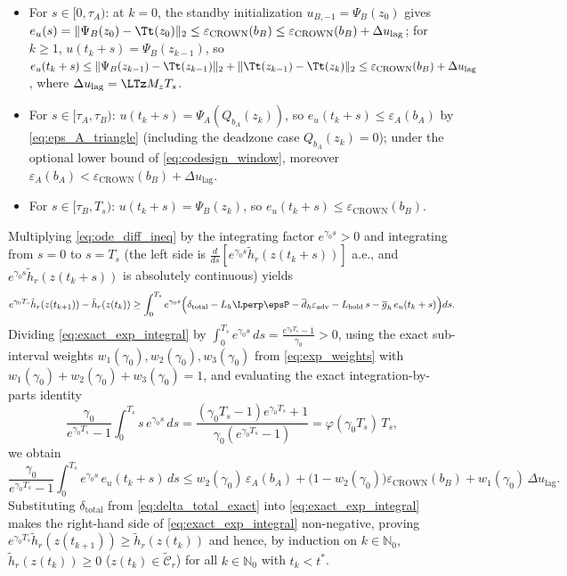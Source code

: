 \begin{itemize}
    \item For \(s \in [0, \tau_A)\): at \(k = 0\), the standby initialization \(u_{B,-1} = \Psi_B(z_0)\) gives \(e_u(s) = \|\Psi_B(z_0) - \Tt(z_0)\|_2 \le \varepsilon_{\mathrm{CROWN}}(b_B) \le \varepsilon_{\mathrm{CROWN}}(b_B) + \Delta u_{\mathrm{lag}}\); for \(k \ge 1\), \(u(t_k + s) = \Psi_B(z_{k-1})\), so \(e_u(t_k + s) \le \|\Psi_B(z_{k-1}) - \Tt(z_{k-1})\|_2 + \|\Tt(z_{k-1}) - \Tt(z_k)\|_2 \le \varepsilon_{\mathrm{CROWN}}(b_B) + \Delta u_{\mathrm{lag}}\), where \(\Delta u_{\mathrm{lag}} = \LTz M_z T_s\).
    \item For \(s \in [\tau_A, \tau_B)\): \(u(t_k + s) = \Psi_A(Q_{b_A}(z_k))\), so \(e_u(t_k + s) \le \varepsilon_A(b_A)\) by \eqref{eq:eps_A_triangle} (including the deadzone case \(Q_{b_A}(z_k) = 0\)); under the optional lower bound of \eqref{eq:codesign_window}, moreover \(\varepsilon_A(b_A) < \varepsilon_{\mathrm{CROWN}}(b_B) + \Delta u_{\mathrm{lag}}\).
    \item For \(s \in [\tau_B, T_s)\): \(u(t_k + s) = \Psi_B(z_k)\), so \(e_u(t_k + s) \le \varepsilon_{\mathrm{CROWN}}(b_B)\).
\end{itemize}
Multiplying \eqref{eq:ode_diff_ineq} by the integrating factor \(e^{\gamma_0 s} > 0\) and integrating from \(s = 0\) to \(s = T_s\) (the left side is \(\frac{d}{ds}[e^{\gamma_0s}\tilde h_r(z(t_k+s))]\) a.e., and \(e^{\gamma_0s}\tilde h_r(z(t_k+s))\) is absolutely continuous) yields
\begin{equation}
\label{eq:exact_exp_integral}
e^{\gamma_0 T_s}\tilde{h}_r(z(t_{k+1})) - \tilde{h}_r(z(t_k)) \ge \int_0^{T_s} e^{\gamma_0 s} \Big( \delta_{\mathrm{total}} - L_h \Lperp\epsP - \overline{d}_h \varepsilon_{\mathrm{adv}} - L_{\mathrm{hold}}\,s - \overline{g}_h\,e_u(t_k + s) \Big) ds.
\end{equation}
Dividing \eqref{eq:exact_exp_integral} by \(\int_0^{T_s} e^{\gamma_0 s}\,ds = \frac{e^{\gamma_0 T_s} - 1}{\gamma_0} > 0\), using the exact sub-interval weights \(w_1(\gamma_0), w_2(\gamma_0), w_3(\gamma_0)\) from \eqref{eq:exp_weights} with \(w_1(\gamma_0) + w_2(\gamma_0) + w_3(\gamma_0) = 1\), and evaluating the exact integration-by-parts identity
\[
\frac{\gamma_0}{e^{\gamma_0 T_s} - 1}\int_0^{T_s} s\,e^{\gamma_0 s}\,ds = \frac{(\gamma_0 T_s - 1)e^{\gamma_0 T_s} + 1}{\gamma_0(e^{\gamma_0 T_s} - 1)} = \varphi(\gamma_0 T_s)\,T_s,
\]
we obtain
\[
\frac{\gamma_0}{e^{\gamma_0 T_s} - 1}\int_0^{T_s} e^{\gamma_0 s}\,e_u(t_k + s)\,ds \le w_2(\gamma_0)\,\varepsilon_A(b_A) + \big(1 - w_2(\gamma_0)\big)\varepsilon_{\mathrm{CROWN}}(b_B) + w_1(\gamma_0)\,\Delta u_{\mathrm{lag}}.
\]
Substituting \(\delta_{\mathrm{total}}\) from \eqref{eq:delta_total_exact} into \eqref{eq:exact_exp_integral} makes the right-hand side of \eqref{eq:exact_exp_integral} non-negative, proving \(e^{\gamma_0 T_s}\tilde{h}_r(z(t_{k+1})) \ge \tilde{h}_r(z(t_k))\) and hence, by induction on \(k \in \mathbb{N}_0\), \(\tilde{h}_r(z(t_k)) \ge 0\) (\(z(t_k) \in \tilde{\mathcal{C}}_r\)) for all \(k \in \mathbb{N}_0\) with \(t_k < t^*\).

